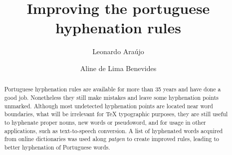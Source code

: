 \documentclass{article}
\title{Improving the portuguese hyphenation rules}
\author{Leonardo Araújo \and Aline de Lima Benevides}
\begin{document}
\VerbatimFootnotes
\maketitle







\begin{abstract}
    Portuguese hyphenation rules are available for more than 35
    years and have done a good job. Nonetheless they still make mistakes and
    leave some hyphenation points unmarked. Although most undetected
    hyphenation points are located near word boundaries, what will be
    irrelevant for \TeX{} typographic purposes, they are still useful to
    hyphenate proper nouns, new words or pseudoword, and for usage in other
    applications, such as text-to-speech conversion. A list of
    \DictionarySize{} hyphenated words acquired from online dictionaries was
    used along \emph{patgen} to create improved rules, leading to better hyphenation
    of Portuguese words.
\end{abstract}
\end{document}
